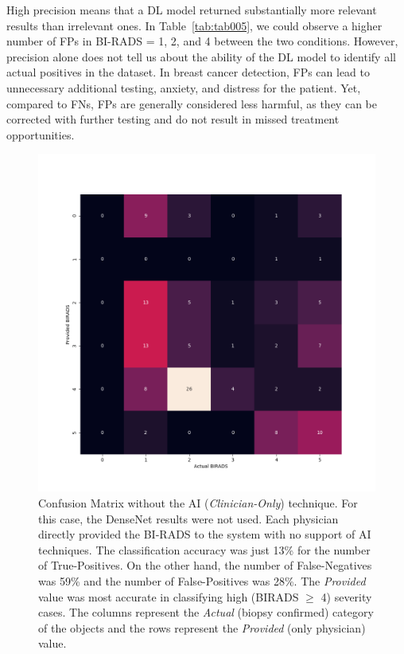 High precision means that a \ac{DL} model returned substantially more relevant results than irrelevant ones.
In Table~\ref{tab:tab005}, we could observe a higher number of \acp{FP} in \ac{BI-RADS} = 1, 2, and 4 between the two conditions.
However, precision alone does not tell us about the ability of the \ac{DL} model to identify all actual positives in the dataset.
In breast cancer detection, \acp{FP} can lead to unnecessary additional testing, anxiety, and distress for the patient.
Yet, compared to \acp{FN}, \acp{FP} are generally considered less harmful, as they can be corrected with further testing and do not result in missed treatment opportunities.

\begin{figure}[htbp]
\centering
\includegraphics[width=\textwidth]{images/fig044}
\caption{Confusion Matrix without the AI ({\it Clinician-Only}) technique. For this case, the DenseNet results were not used. Each physician directly provided the BI-RADS to the system with no support of AI techniques. The classification accuracy was just 13\% for the number of True-Positives. On the other hand, the number of False-Negatives was 59\% and the number of False-Positives was 28\%. The {\it Provided} value was most accurate in classifying high (BIRADS $\ge$ 4) severity cases. The columns represent the {\it Actual} (biopsy confirmed) category of the objects and the rows represent the {\it Provided} (only physician) value.}
\label{fig:fig044}
\end{figure}

